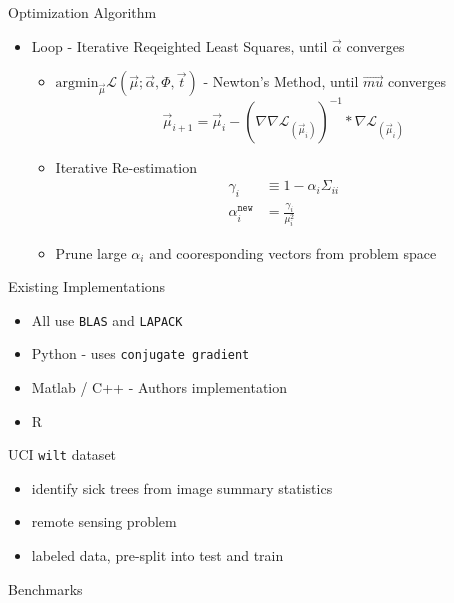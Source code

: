 \documentclass[10pt]{beamer}
\begin{document}
\begin{frame}{Optimization Algorithm}

  \begin{itemize}
  \item Loop - Iterative Reqeighted Least Squares, until $\vec{\alpha}$ converges
    \begin{itemize}
    \item \(\mbox{argmin}_{\vec{\mu}} \mathcal{L}(\vec{\mu}; \vec{\alpha}, \Phi, \vec{t})\)
      - Newton's Method, until $\vec{mu}$ converges
      \[\vec{\mu}_{i+1} = \vec{\mu}_i - (\nabla\nabla\mathcal{L}_{(\vec{\mu}_i)})^{-1} * \nabla\mathcal{L}_{(\vec{\mu}_i)}\]
    \item Iterative Re-estimation
      \begin{align*}
        \gamma_i &\equiv 1 - \alpha_i \Sigma_{ii}\\
        \alpha_i^{\texttt{new}} &= \frac{\gamma_i}{\mu_i^2}
      \end{align*}
    \item Prune large $\alpha_i$ and cooresponding vectors from problem space
\end{itemize}
  \end{itemize}
\end{frame}

\begin{frame}{Existing Implementations}
  \begin{itemize}
  \item All use \texttt{BLAS} and \texttt{LAPACK}
  \item Python - uses \texttt{conjugate gradient}
  \item Matlab / C++ - Authors implementation
  \item R
  \end{itemize}
\end{frame}

\begin{frame}{UCI \texttt{wilt} dataset}
  \begin{itemize}
  \item identify sick trees from image summary statistics
  \item remote sensing problem
  \item labeled data, pre-split into test and train
  \end{itemize}
\end{frame}

\begin{frame}{Benchmarks}
\end{frame}
\end{document}
